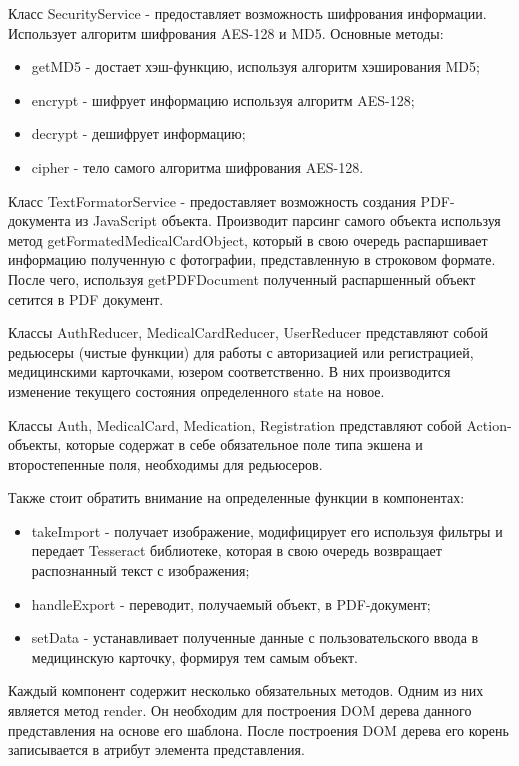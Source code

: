 Класс SecurityService - предоставляет возможность шифрования информации. Использует алгоритм шифрования AES-128 и MD5. Основные методы:
\begin{itemize}
  \item getMD5 - достает хэш-функцию, используя алгоритм хэширования MD5;
  \item encrypt - шифрует информацию используя алгоритм AES-128;
  \item decrypt - дешифрует информацию;
  \item cipher - тело самого алгоритма шифрования AES-128.
\end{itemize}

Класс TextFormatorService - предоставляет возможность создания PDF-документа из JavaScript объекта. Производит парсинг самого объекта используя метод getFormatedMedicalCardObject, который в свою очередь распаршивает информацию полученную с фотографии, представленную в строковом формате. После чего, используя getPDFDocument полученный распаршенный объект сетится в PDF документ.

Классы AuthReducer, MedicalCardReducer, UserReducer представляют собой редьюсеры (чистые функции) для работы с авторизацией или регистрацией, медицинскими карточками, юзером соответственно. В них производится изменение текущего состояния определенного state на новое.

Классы Auth, MedicalCard, Medication, Registration представляют собой Action-объекты, которые содержат в себе обязательное поле типа экшена и второстепенные поля, необходимы для редьюсеров.

Также стоит обратить внимание на определенные функции в компонентах:
\begin{itemize}
  \item takeImport - получает изображение, модифицирует его используя фильтры и передает Tesseract библиотеке, которая в свою очередь возвращает распознанный текст с изображения;
  \item handleExport - переводит, получаемый объект, в PDF-документ;
  \item setData - устанавливает полученные данные с пользовательского ввода в медицинскую карточку, формируя тем самым объект.
\end{itemize}

Каждый компонент содержит несколько обязательных методов. Одним из них является метод render. Он необходим для построения DOM дерева данного представления на основе его шаблона. После построения DOM дерева его корень записывается в атрибут элемента представления.

